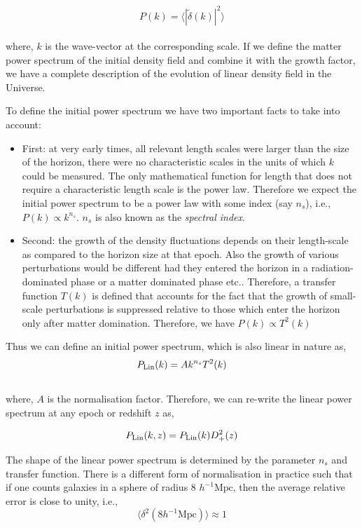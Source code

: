 \documentclass[
  11pt,
  twoside,
  openright,
  titlepage,
  headings=optiontoheadandtoc
]{scrbook}
\begin{document}
\begin{equation}
		P(k)  =  \langle |\tilde{\delta}(k) |^2\rangle 
		\label{eqn:pksim}
\end{equation}
\\
where, $k$ is the wave-vector at the corresponding scale. If we 
define the matter power spectrum of the initial density field and combine
it with the growth factor, we have a complete description of the evolution 
of linear density field in the Universe. 

To define the initial power spectrum we have two important facts to 
take into account:
\begin{itemize}
  \item	First: at very early times, all relevant length scales
	were larger than the size of the horizon, there were no characteristic scales
	in the units of which $k$ could be measured. The only mathematical function
	for length that does not require a characteristic length scale is
	the power law. Therefore we expect the initial power spectrum to be a power
	law with some index (say $n_s$), i.e., $P(k)\propto k^{n_s}$. $n_s$ is also known
	as the {\it spectral index}.
  \item Second: the growth of the density fluctuations depends on their length-scale
  	as compared to the horizon size at that epoch. Also the growth of various
  	perturbations would be different had they entered the horizon in a radiation-
  	dominated phase or a matter dominated phase etc.. Therefore, a transfer function $T(k)$
  	is defined that accounts for the fact that the growth of small-scale perturbations
  	is suppressed relative to those which enter the horizon only after matter domination.
  	Therefore, we have $P(k) \propto T^2(k)$ 
\end{itemize}

Thus we can define an initial power spectrum, which is also linear in nature as,
\begin{equation}
	P_{\rm Lin}(k) = A k^{n_s} T^2(k)
\end{equation}
\\
where, $A$ is the normalisation factor. Therefore, we can re-write the linear
power spectrum at any epoch or redshift $z$ as,

\begin{equation}
	P_{\rm Lin}(k,z) = P_{\rm Lin}(k) D^2_+(z)
\end{equation}

The shape of the linear power spectrum is determined by the parameter $n_s$ and 
transfer function. There is a different form of normalisation in 
practice such that if one counts galaxies in a sphere of radius 8 $h^{-1} \mathrm{Mpc}$, then
the average relative error is close to unity, i.e.,
\begin{equation}
	\langle \delta^2(8 h^{-1} \mathrm{Mpc}) \rangle \approx 1 
\end{equation}
\end{document}
